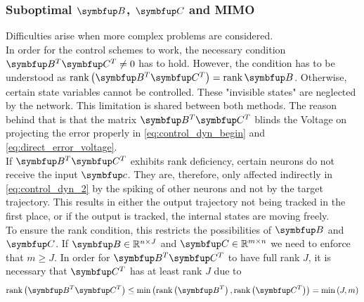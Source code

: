 \subsubsection{Suboptimal $\bmu{B}$, $\bmu{C}$ and \ac{MIMO}}
Difficulties arise when more complex problems are considered.\\
In order for the control schemes to work, the necessary condition $\bmu{B}^T\bmu{C}^T \neq 0$ has to hold\cite{huang_dynamics_2019}. However, the condition has to be understood as $\rank\left(\bmu{B}^T\bmu{C}^T\right) = \rank{\bmu{B}}$. Otherwise, certain state variables cannot be controlled. These "invisible states" are neglected by the network. This limitation is shared between both methods. The reason behind that is
that the matrix $\bmu{B}^T\bmu{C}^T$ blinds the Voltage on projecting the error properly in \cref{eq:control_dyn_begin} and \cref{eq:direct_error_voltage}.\\
If $\bmu{B}^T\bmu{C}^T$ exhibits rank deficiency, certain neurons do not receive the input $\bmu{c}$. They are, therefore, only affected indirectly in \cref{eq:control_dyn_2} by the spiking of other neurons and not by the target trajectory. This results in either the output trajectory not being tracked in the first place, or if the output is tracked, the internal states are moving freely.\\
To ensure the rank condition, this restricts the possibilities of $\bmu{B}$ and $\bmu{C}$. If $\bmu{B} \in \mathbb{R}^{n\times J}$ and $\bmu{C} \in \mathbb{R}^{m\times n}$ we need to enforce that $m\geq J$. In order for $\bmu{B}^T\bmu{C}^T$ to have full rank $J$, it is necessary that $\bmu{C}^T$ has at least rank $J$ due to
\begin{equation}
	\rank\left(\bmu{B}^T\bmu{C}^T\right) \leq \min\left(\rank\left(\bmu{B}^T\right),\rank\left(\bmu{C}^T\right)\right) = \min\left(J,m\right)
\end{equation}

